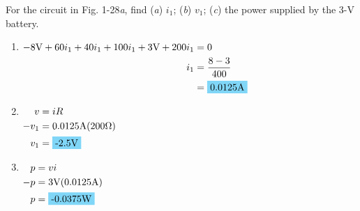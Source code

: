 For the circuit in Fig. 1-28\emph{a}, find (\emph{a}) $i_1$; (\emph{b}) $v_1$; (\emph{c}) the power supplied by the 3-V battery.

\begin{enumerate}[leftmargin=2cm,labelsep=.5cm,label=\bfseries\alph*)]
	\item $
	\begin{aligned}[t]
	-8\qw{\V}+60i_1+40i_1+100i_1+3\qw{\V}+200i_1 &= 0 \\
	i_1 &= \frac{8-3}{400} \\
	&= \hlbox{0.0125\qw{\A}}
	\end{aligned} $
	\\[1cm]
	
	\item $
	\begin{aligned}[t]
	v &= iR \\
	-v_1 &= 0.0125\qw{\A}(200\qw{\ohm})\\
	v_1 &= \hlbox{-2.5\qw{\V}}
	\end{aligned} $
	\\[1cm]
	
	\item $
	\begin{aligned}[t]
	p &= vi \\
	-p &= 3\qw{\V}(0.0125\qw{\A}) \\
	p &= \hlbox{-0.0375\qw{\W}}
	\end{aligned} $
	\\[1cm]
\end{enumerate}